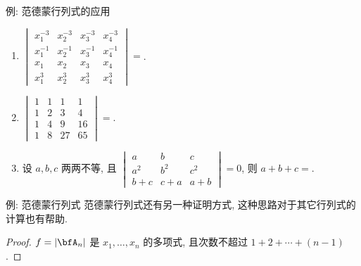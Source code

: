 \begin{frame}{例: 范德蒙行列式的应用}
	\onslide<+->
	\begin{exercise}
		\begin{enumerate}
			\item $\begin{vmatrix}
				x_1^{-3}&x_2^{-3}&x_3^{-3}&x_4^{-3}\\
				x_1^{-1}&x_2^{-1}&x_3^{-1}&x_4^{-1}\\
				x_1&x_2&x_3&x_4\\
				x_1^{3}&x_2^{3}&x_3^{3}&x_4^{3}
			\end{vmatrix}=$.
			\item $\begin{vmatrix}
				1&1&1&1\\
				1&2&3&4\\
				1&4&9&16\\
				1&8&27&65
			\end{vmatrix}=$.
			\item 设 $a,b,c$ 两两不等, 且 $\begin{vmatrix}
				a&b&c\\
				a^2&b^2&c^2\\
				b+c&c+a&a+b
			\end{vmatrix}=0$, 则 $a+b+c=$.
		\end{enumerate}
	\end{exercise}
\end{frame}


\begin{frame}{例: 范德蒙行列式\noexer}
	\onslide<+->
	范德蒙行列式还有另一种证明方式, 这种思路对于其它行列式的计算也有帮助.
	\onslide<+->
	\begin{proof}
		$f=|\bfA_n|$ 是 $x_1,\dots,x_n$ 的多项式, 且次数不超过 $1+2+\cdots+(n-1)$.
		\onslide<+->{%
			因此 $g=1$.\qedhere
		}
	\end{proof}
\end{frame}


